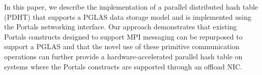 
In this paper, we describe the implementation of a parallel distributed hash
table (PDHT) that supports a PGLAS data storage model and is implemented using
the Portals networking interface.  Our approach demonstrates that existing
Portals constructs designed to support MPI messaging can be repurposed to
support a PGLAS and that the novel use of these primitive communication operations
can further provide a hardware-accelerated parallel hash table on systems where
the Portals constructs are supported through an offload NIC.



